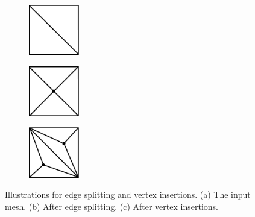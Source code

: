 \begin{figure}[p]
\centering
\begin{subfigure}[c]{0.3\linewidth}
\centering
\includegraphics[height=2.2cm]{images/cutting-mig2015/basic_mesh.pdf}
\caption{\label{fig:basicMesh}}
\end{subfigure}
\hfill
\begin{subfigure}[c]{0.3\linewidth}
\centering
\includegraphics[height=2.2cm]{images/cutting-mig2015/edge_split.pdf}
\caption{\label{fig:edgeSplitting}}
\end{subfigure}
\hfill
\begin{subfigure}[c]{0.3\linewidth}
\centering
\includegraphics[height=2.2cm]{images/cutting-mig2015/vertex_insertion.pdf}
\caption{\label{fig:vertexInsertion}}
\end{subfigure}
\caption[Frame-based cutting: Edge splitting and vertex insertion]{\label{fig:operations} Illustrations for edge splitting and vertex insertions. (a) The input mesh. (b) After edge splitting. (c) After vertex insertions.}
\end{figure}

